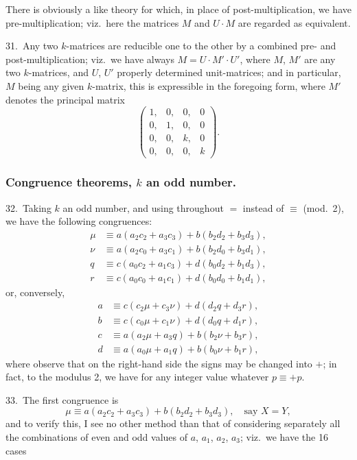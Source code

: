 \documentclass[11pt,a4paper]{book}
\begin{document}
There is obviously a like theory for which, in place of post-multiplication, we have pre-multiplication; viz.\ here the matrices $M$ and $U \cdot M$ are regarded as equivalent.

\medskip

31.\ Any two $k$-matrices are reducible one to the other by a combined pre- and post-multiplication; viz.\ we have always $M = U \cdot M' \cdot U'$, where $M$, $M'$ are any two $k$-matrices, and $U$, $U'$ properly determined unit-matrices; and in particular, $M$ being any given $k$-matrix, this is expressible in the foregoing form, where $M'$ denotes the principal matrix
\[
\begin{pmatrix}
1, & 0, & 0, & 0\\
0, & 1, & 0, & 0\\
0, & 0, & k, & 0\\
0, & 0, & 0, & k
\end{pmatrix}.
\]

\subsubsection*{Congruence theorems, $k$ an odd number.}

\medskip

32.\ Taking $k$ an odd number, and using throughout $=$ instead of $\equiv$ (mod.~2), we have the following congruences:
\begin{align*}
\mu &\equiv a(a_2c_2 + a_3c_3) + b(b_2d_2 + b_3d_3),\\
\nu &\equiv a(a_2c_0 + a_3c_1) + b(b_2d_0 + b_3d_1),\\
q &\equiv c(a_0c_2 + a_1c_3) + d(b_0d_2 + b_1d_3),\\
r &\equiv c(a_0c_0 + a_1c_1) + d(b_0d_0 + b_1d_1),
\end{align*}
or, conversely,
\begin{align*}
a &\equiv c(c_2\mu + c_3\nu) + d(d_2q + d_3r),\\
b &\equiv c(c_0\mu + c_1\nu) + d(d_0q + d_1r),\\
c &\equiv a(a_2\mu + a_3q) + b(b_2\nu + b_3r),\\
d &\equiv a(a_0\mu + a_1q) + b(b_0\nu + b_1r),
\end{align*}
where observe that on the right-hand side the signs may be changed into $+$; in fact, to the modulus 2, we have for any integer value whatever $p \equiv +p$.

\medskip

33.\ The first congruence is
\[
\mu \equiv a(a_2c_2 + a_3c_3) + b(b_2d_2 + b_3d_3), \quad \text{say } X = Y,
\]
and to verify this, I see no other method than that of considering separately all the combinations of even and odd values of $a$, $a_1$, $a_2$, $a_3$; viz.\ we have the 16 cases
\end{document}
